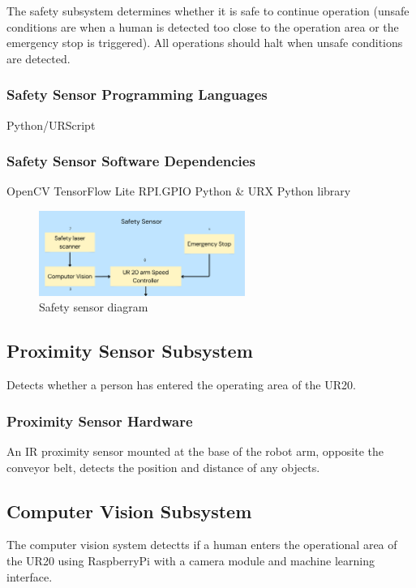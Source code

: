 
The safety subsystem determines whether it is safe to continue operation (unsafe conditions are when a human is detected too close to the operation area or the emergency stop is triggered). All operations should halt when unsafe conditions are detected.

\subsubsection{Safety Sensor Programming Languages}
Python/URScript

\subsubsection{Safety Sensor Software Dependencies}
OpenCV
TensorFlow Lite
RPI.GPIO
Python \& URX Python library

\begin{figure}[h!]
	\centering
 	\includegraphics[width=0.60\textwidth]{images/safety.png}
 \caption{Safety sensor diagram}
\end{figure}

\subsection{Proximity Sensor Subsystem}
Detects whether a person has entered the operating area of the UR20. 

\subsubsection{Proximity Sensor Hardware}
An IR proximity sensor mounted at the base of the robot arm, opposite the conveyor belt, detects the position and distance of any objects.

\subsection{Computer Vision Subsystem}
The computer vision system detectts if a human enters the operational area of the UR20 using RaspberryPi with a camera module and machine learning interface.
